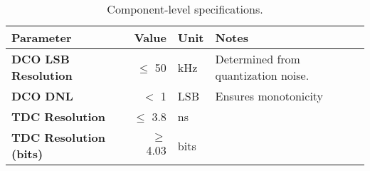 \begin{table}[h!]
	\centering
	\def\arraystretch{1.5}		
	\setlength\arrayrulewidth{0.75pt}
	\setlength{\tabcolsep}{1em} %
	\begin{tabular}{|l|r|l|l|}
		\hline 
		\rule[-1ex]{0pt}{2.5ex} \cellcolor{gray!40}\textbf{Parameter} & \cellcolor{gray!40}\textbf{Value} & \cellcolor{gray!40}\textbf{Unit }& \cellcolor{gray!40}\textbf{Notes}\\ 
		\hline 
		\rule[-1ex]{0pt}{2.5ex} \textbf{DCO LSB Resolution}  & $\leq$ 50  & kHz & Determined from quantization noise.\\ 
		\hline 
		\rule[-1ex]{0pt}{2.5ex} \textbf{DCO DNL} & $<$ 1 & LSB & Ensures monotonicity \\ 
		\hline 
		\rule[-1ex]{0pt}{2.5ex} \textbf{TDC Resolution} & $\leq$ 3.8  & ns & \\ 
		\hline 
		\rule[-1ex]{0pt}{2.5ex} \textbf{TDC Resolution (bits)} & $\geq$ 4.03 &bits & \\ 
		\hline 
	\end{tabular} 
	\caption{Component-level specifications.}
\end{table}   

\FloatBarrier
